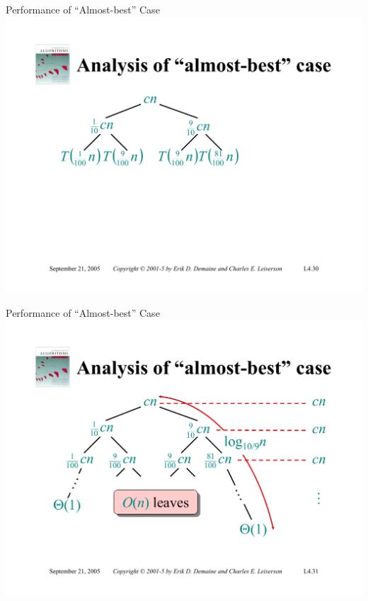 \documentclass{beamer}
\begin{document}
\begin{frame}{Performance of ``Almost-best'' Case}
    \centering
    \includegraphics[width=\textwidth, trim={1.00cm 1.50cm 1.00cm 4.25cm}, clip]{pages/lec4_30}
\end{frame}
\begin{frame}{Performance of ``Almost-best'' Case}
    \centering
    \includegraphics[width=\textwidth, trim={1.00cm 1.50cm 1.00cm 4.25cm}, clip]{pages/lec4_31}
\end{frame}
\end{document}
